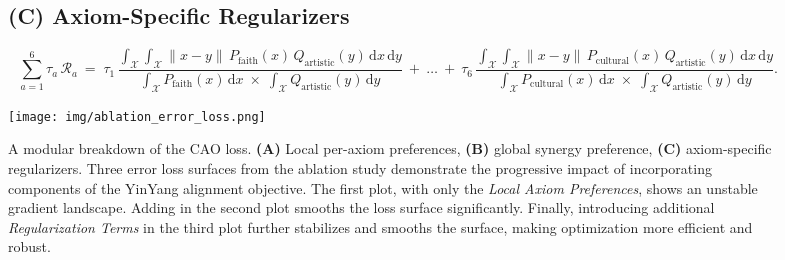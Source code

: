\begin{figure*}[ht!]
\begin{tcolorbox}[
  enhanced,
  colback=white,
  colframe=black,
  boxrule=1pt,
  borderline={0.6pt}{2pt}{black},
  sharp corners,
  width=\textwidth
]
\begin{minipage}{\textwidth}
\vspace{-2.5mm}
\subsection*{(C) Axiom-Specific Regularizers}
\begin{equation*}
\sum_{a=1}^{6} \tau_{a}\,\mathcal{R}_a
~=\;
\tau_{1}\,\frac{\displaystyle
   \int_{\mathcal{X}}\!\!\int_{\mathcal{X}}
   \|x-y\|\,
   P_{\text{faith}}(x)\,
   Q_{\text{artistic}}(y)
   \,\mathrm{d}x\,\mathrm{d}y
}{
   \displaystyle
   \int_{\mathcal{X}}P_{\text{faith}}(x)\,\mathrm{d}x
   \;\times\;
   \int_{\mathcal{X}}Q_{\text{artistic}}(y)\,\mathrm{d}y
}
~+~
\ldots
~+~
\tau_{6}\,\frac{\displaystyle
   \int_{\mathcal{X}}\!\!\int_{\mathcal{X}}
   \|x-y\|\,
   P_{\text{cultural}}(x)\,
   Q_{\text{artistic}}(y)
   \,\mathrm{d}x\,\mathrm{d}y
}{
   \displaystyle
   \int_{\mathcal{X}}P_{\text{cultural}}(x)\,\mathrm{d}x
   \;\times\;
   \int_{\mathcal{X}}Q_{\text{artistic}}(y)\,\mathrm{d}y
}.
\end{equation*}

\end{minipage}
\end{tcolorbox}

\vspace{-2mm}
\texttt{[image: img/ablation\_error\_loss.png]}

\captionsetup{justification=justified, singlelinecheck=false}
\caption{A modular breakdown of the CAO loss. 
\textbf{(A)} Local per-axiom preferences, 
\textbf{(B)} global synergy preference, 
\textbf{(C)} axiom-specific regularizers. 
Three error loss surfaces from the ablation study demonstrate the progressive impact of incorporating components of the YinYang alignment objective. 
The first plot, with only the \textit{Local Axiom Preferences}, shows an unstable gradient landscape. 
Adding in the second plot smooths the loss surface significantly. 
Finally, introducing additional \textit{Regularization Terms} in the third plot further stabilizes and smooths the surface, making optimization more efficient and robust.}







\end{figure*}
